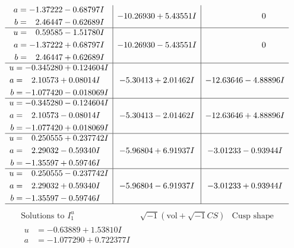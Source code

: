 \documentclass[1p]{elsarticle_modified}
\theoremstyle{definition}
\newcommand{\I}{\sqrt{-1}}
\begin{document}
$$\begin{array}{c|c|c}
\begin{aligned}
a &= -1.37222 - 0.68797 I \\
b &= \phantom{-}2.46447 - 0.62689 I\end{aligned}
 & -10.26930 + 5.43551 I & \phantom{-0.000000 } 0 \\ \hline\begin{aligned}
u &= \phantom{-}0.59585 - 1.51780 I \\
a &= -1.37222 + 0.68797 I \\
b &= \phantom{-}2.46447 + 0.62689 I\end{aligned}
 & -10.26930 - 5.43551 I & \phantom{-0.000000 } 0 \\ \hline\begin{aligned}
u &= -0.345280 + 0.124604 I \\
a &= \phantom{-}2.10573 + 0.08014 I \\
b &= -1.077420 - 0.018069 I\end{aligned}
 & -5.30413 + 2.01462 I & -12.63646 - 4.88896 I \\ \hline\begin{aligned}
u &= -0.345280 - 0.124604 I \\
a &= \phantom{-}2.10573 - 0.08014 I \\
b &= -1.077420 + 0.018069 I\end{aligned}
 & -5.30413 - 2.01462 I & -12.63646 + 4.88896 I \\ \hline\begin{aligned}
u &= \phantom{-}0.250555 + 0.237742 I \\
a &= \phantom{-}2.29032 - 0.59340 I \\
b &= -1.35597 + 0.59746 I\end{aligned}
 & -5.96804 + 6.91937 I & -3.01233 - 0.93944 I \\ \hline\begin{aligned}
u &= \phantom{-}0.250555 - 0.237742 I \\
a &= \phantom{-}2.29032 + 0.59340 I \\
b &= -1.35597 - 0.59746 I\end{aligned}
 & -5.96804 - 6.91937 I & -3.01233 + 0.93944 I\\
 \hline 
 \end{array}$$\newpage$$\begin{array}{c|c|c}  
\text{Solutions to }I^u_{1}& \I (\text{vol} + \sqrt{-1}CS) & \text{Cusp shape}\\
 \hline 
\begin{aligned}
u &= -0.63889 + 1.53810 I \\
a &= -1.077290 + 0.722377 I \\

\end{aligned}
\end{array}$$
\end{document}
